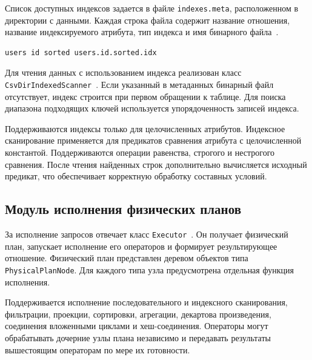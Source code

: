 \documentclass[fontsize=14pt, russian]{scrartcl}
\begin{document}
Список доступных индексов задается в файле \verb|indexes.meta|,
расположенном в директории с данными. Каждая строка файла содержит
название отношения, название индексируемого атрибута, тип индекса и имя
бинарного файла~.

\begin{listing}[H]
  \caption{Пример файла с метаданными о доступных индексах.}
  \label{lst:meta}
\begin{verbatim}
users id sorted users.id.sorted.idx
\end{verbatim}
\end{listing}

Для чтения данных с использованием индекса реализован класс
\verb|CsvDirIndexedScanner|~. Если указанный в
метаданных бинарный файл отсутствует, индекс строится при первом обращении к
таблице. Для поиска диапазона подходящих ключей используется упорядоченность
записей индекса.

Поддерживаются индексы только для целочисленных атрибутов. Индексное
сканирование применяется для предикатов сравнения атрибута с
целочисленной константой. Поддерживаются операции равенства, строгого и
нестрогого сравнения. После чтения найденных строк дополнительно
вычисляется исходный предикат, что обеспечивает корректную обработку
составных условий.

\subsection{Модуль исполнения физических планов}

За исполнение запросов отвечает класс \verb|Executor|~.
Он получает физический план, запускает исполнение его операторов и формирует
результирующее отношение. Физический план представлен деревом объектов типа
\verb|PhysicalPlanNode|. Для каждого типа узла предусмотрена отдельная функция
исполнения.

Поддерживается исполнение последовательного и индексного сканирования,
фильтрации, проекции, сортировки, агрегации, декартова произведения, соединения
вложенными циклами и хеш-соединения. Операторы могут обрабатывать дочерние узлы
плана независимо и передавать результаты вышестоящим операторам по мере их
готовности.
\end{document}
